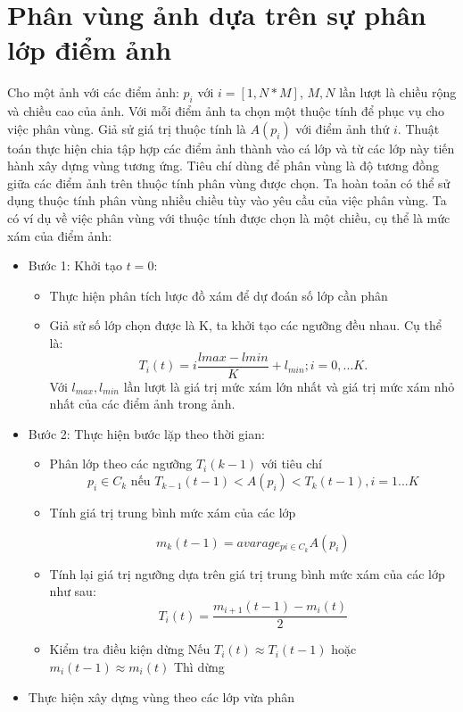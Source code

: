 \documentclass[12pt,oneside,a4]{report}
\begin{document}
\section{Phân vùng ảnh dựa trên sự phân lớp điểm ảnh}
Cho một ảnh với các điểm ảnh: $p_{i}$ với $i=[1,N*M]$, $M,N$ lần lượt là chiều rộng và chiều cao của ảnh. Với mỗi điểm ảnh ta chọn một thuộc tính để phục vụ cho việc phân vùng. Giả sử giá trị thuộc tính là $A(p_{i})$ với điểm ảnh thứ $i$. Thuật toán thực hiện chia tập hợp các điểm ảnh thành vào cá lớp và từ các lớp này tiến hành xây dựng vùng tương ứng. Tiêu chí dùng để phân vùng là độ tương đồng giữa các điểm ảnh trên thuộc tính phân vùng được chọn. Ta hoàn toản có thể sử dụng thuộc tính phân vùng nhiều chiều tùy vào yêu cầu của việc phân vùng.
Ta có ví dụ về việc phân vùng với thuộc tính được chọn là một chiều, cụ thể là mức xám của điểm ảnh:
\begin{itemize}
\item Bước 1:
Khởi tạo $t=0$:
\begin{itemize}
\item Thực hiện phân tích lược đồ xám để dự đoán số lớp cần phân
\item Giả sử số lớp chọn được là K, ta khởi tạo các ngưỡng đều nhau. Cụ thể là:
\begin{equation}
T_i(t)=i\dfrac{lmax-lmin}{K}+l_{min}; i=0,...K. 
\end{equation}
Với $l_{max}, l_{min}$ lần lượt là giá trị mức xám lớn nhất và giá trị mức xám nhỏ nhất của các điểm ảnh trong ảnh.
\end{itemize}
\item Bước 2: Thực hiện bước lặp theo thời gian:
\begin{itemize}
\item Phân lớp theo các ngưỡng $T_i(k-1)$ với tiêu chí
\begin{equation}
p_i\in C_k \textrm{ nếu }T_{k-1}(t-1)<A(p_i)<T_{k}(t-1), i=1...K
\end{equation}
\item Tính giá trị trung bình mức xám của các lớp 

\begin{equation}
m_k(t-1)= avarage_{pi\in C_k}A(p_i)
\end{equation}
\item Tính lại giá trị ngưỡng dựa trên giá trị trung bình mức xám của các lớp như sau:
\begin{equation}
T_i(t)=\dfrac{m_{i+1}(t-1)-m_{i}(t)}{2}
\end{equation}
\item Kiểm tra điều kiện dừng
Nếu $T_i(t)\approx T_i(t-1)$ hoặc $m_{i}(t-1)\approx m_{i}(t)$ Thì dừng
\end{itemize}
\item Thực hiện xây dựng vùng theo các lớp vừa phân
\end{itemize}
\end{document}
